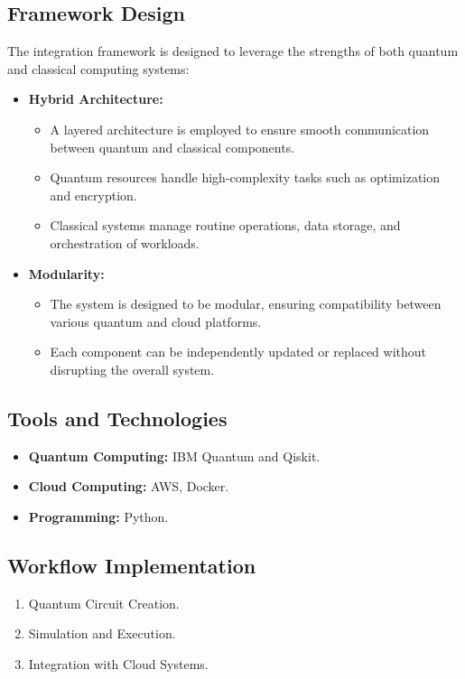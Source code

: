 \documentclass[conference]{IEEEtran}
\begin{document}
\subsection{Framework Design}
The integration framework is designed to leverage the strengths of both quantum and classical computing systems:
\begin{itemize}
    \item \textbf{Hybrid Architecture:}
    \begin{itemize}
        \item A layered architecture is employed to ensure smooth communication between quantum and classical components.
        \item Quantum resources handle high-complexity tasks such as optimization and encryption.
        \item Classical systems manage routine operations, data storage, and orchestration of workloads.
    \end{itemize}
    \item \textbf{Modularity:}
    \begin{itemize}
        \item The system is designed to be modular, ensuring compatibility between various quantum and cloud platforms.
        \item Each component can be independently updated or replaced without disrupting the overall system.
    \end{itemize}
\end{itemize}

\subsection{Tools and Technologies}
\begin{itemize}
    \item \textbf{Quantum Computing:} IBM Quantum and Qiskit.
    \item \textbf{Cloud Computing:} AWS, Docker.
    \item \textbf{Programming:} Python.
\end{itemize}

\subsection{Workflow Implementation}
\begin{enumerate}
    \item Quantum Circuit Creation.
    \item Simulation and Execution.
    \item Integration with Cloud Systems.
\end{enumerate}
\end{document}
